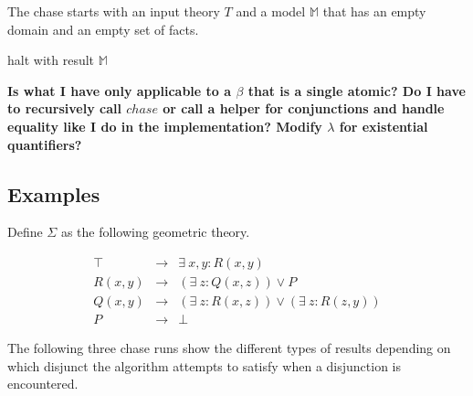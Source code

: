 		The chase starts with an input theory $T$ and a model $\mathbb{M}$ that
		has an empty domain and an empty set of facts.

		\begin{algorithm}[H]
		\DontPrintSemicolon
		halt with result $\mathbb{M}$ \;
		\end{algorithm}

		\textbf{Is what I have only applicable to a $\beta$ that is a single
		atomic? Do I have to recursively call $chase$ or call a helper for
		conjunctions and handle equality like I do in the implementation?
		Modify $\lambda$ for existential quantifiers?}

	\subsection{Examples}

		Define $\Sigma$ as the following geometric theory.

		\begin{eqnarray}
			\label{eqn:chase1}
			\top    &  \to  &  \exists\ x,y : R(x,y)                             \\
			\label{eqn:chase2}
			R(x,y)  &  \to  &  (\exists\ z : Q(x,z)) \vee P                      \\
			\label{eqn:chase3}
			Q(x,y)  &  \to  &  (\exists\ z : R(x,z)) \vee (\exists\ z : R(z,y))  \\
			\label{eqn:chase4}
			P       &  \to  &  \bot
		\end{eqnarray}

		The following three chase runs show the different types of results
		depending on which disjunct the algorithm attempts to satisfy when a
		disjunction is encountered.

